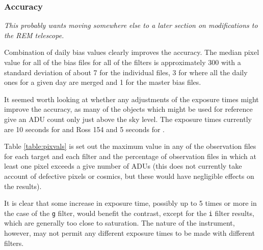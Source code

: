 \subsubsection{Accuracy}
\protect\label{section:accuracy}

\textit{This probably wants moving somewhere else to a later section on
modifications to the REM telescope.}

Combination of daily bias values clearly improves the accuracy. The median
pixel value for all of the bias files for all of the filters is approximately
300 with a standard deviation of about 7 for the individual files, 3 for where
all the daily ones for a given day are merged and 1 for the master bias files.

It seemed worth looking at whether any adjustments of the exposure times might
improve the accuracy, as many of the objects which might be used for reference
give an ADU count only just above the sky level. The exposure times currently
are 10 seconds for {\prox} and Ross 154 and 5 seconds for \bstar.

Table \ref{table:pixvals} is set out the maximum value in any of the observation
files for each target and each filter and the percentage of observation files in
which at least one pixel exceeds a give number of ADUs (this does not currently
take account of defective pixels or cosmics, but these would have negligible
effects on the results).

It is clear that some increase in exposure time, possibly up to 5 times or more
in the case of the \texttt{g} filter, would benefit the contrast, except
for the \texttt{i} filter results, which are generally too close to saturation.
The nature of the instrument, however, may not permit any different exposure
times to be made with different filters.

